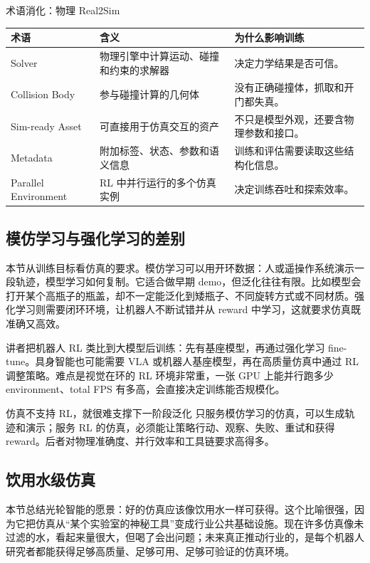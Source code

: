 \begin{knowledgebox}{术语消化：物理 Real2Sim}
\begin{tabularx}{\textwidth}{p{}p{}X}
\toprule
术语 & 含义 & 为什么影响训练 \\
\midrule
Solver & 物理引擎中计算运动、碰撞和约束的求解器 & 决定力学结果是否可信。 \\
Collision Body & 参与碰撞计算的几何体 & 没有正确碰撞体，抓取和开门都失真。 \\
Sim-ready Asset & 可直接用于仿真交互的资产 & 不只是模型外观，还要含物理参数和接口。 \\
Metadata & 附加标签、状态、参数和语义信息 & 训练和评估需要读取这些结构化信息。 \\
Parallel Environment & RL 中并行运行的多个仿真实例 & 决定训练吞吐和探索效率。 \\
\bottomrule
\end{tabularx}
\end{knowledgebox}

\subsection{模仿学习与强化学习的差别}

本节从训练目标看仿真的要求。模仿学习可以用开环数据：人或遥操作系统演示一段轨迹，模型学习如何复制。它适合做早期 demo，但泛化往往有限。比如模型会打开某个高瓶子的瓶盖，却不一定能泛化到矮瓶子、不同旋转方式或不同材质。强化学习则需要闭环环境，让机器人不断试错并从 reward 中学习，这就要求仿真既准确又高效。

讲者把机器人 RL 类比到大模型后训练：先有基座模型，再通过强化学习 fine-tune。具身智能也可能需要 VLA 或机器人基座模型，再在高质量仿真中通过 RL 调整策略。难点是视觉在环的 RL 环境非常重，一张 GPU 上能并行跑多少 environment、total FPS 有多高，会直接决定训练能否规模化。

\begin{warningbox}{仿真不支持 RL，就很难支撑下一阶段泛化}
只服务模仿学习的仿真，可以生成轨迹和演示；服务 RL 的仿真，必须能让策略行动、观察、失败、重试和获得 reward。后者对物理准确度、并行效率和工具链要求高得多。
\end{warningbox}

\subsection{饮用水级仿真}

本节总结光轮智能的愿景：好的仿真应该像饮用水一样可获得。这个比喻很强，因为它把仿真从“某个实验室的神秘工具”变成行业公共基础设施。现在许多仿真像未过滤的水，看起来量很大，但喝了会出问题；未来真正推动行业的，是每个机器人研究者都能获得足够高质量、足够可用、足够可验证的仿真环境。

